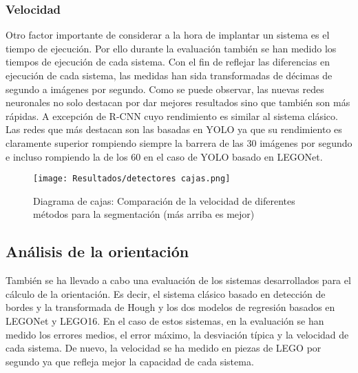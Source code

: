 {\subsubsection*{Velocidad}
Otro factor importante de considerar a la hora de implantar un sistema es el tiempo de ejecución. Por ello durante la evaluación también se han medido los tiempos de ejecución de cada sistema. Con el fin de reflejar las diferencias en ejecución de cada sistema, las medidas han sida transformadas de décimas de segundo a imágenes por segundo. Como se puede observar, las nuevas redes neuronales no solo destacan por dar mejores resultados sino que también son más rápidas. A excepción de R-CNN cuyo rendimiento es similar al sistema clásico. Las redes que más destacan son las basadas en YOLO ya que su rendimiento es claramente superior rompiendo siempre la barrera de las 30 imágenes por segundo e incluso rompiendo la de los 60 en el caso de YOLO basado en LEGONet.

\begin{figure}[ht]  %
\vspace{-10pt}
	\centering
	\texttt{[image: Resultados/detectores cajas.png]}
	\caption{Diagrama de cajas: Comparación de la velocidad de diferentes métodos para la segmentación (más arriba es mejor)}
	\label{fig:resm3}
\end{figure}

\subsection*{Análisis de la orientación}
También se ha llevado a cabo una evaluación de los sistemas desarrollados para el cálculo de la orientación. Es decir, el sistema clásico basado en detección de bordes y la transformada de Hough y los dos modelos de regresión basados en LEGONet y LEGO16. En el caso de estos sistemas, en la evaluación se han medido los errores medios, el error máximo, la desviación típica y la velocidad de cada sistema. De nuevo, la velocidad se ha medido en piezas de LEGO por segundo ya que refleja mejor la capacidad de cada sistema.

}
